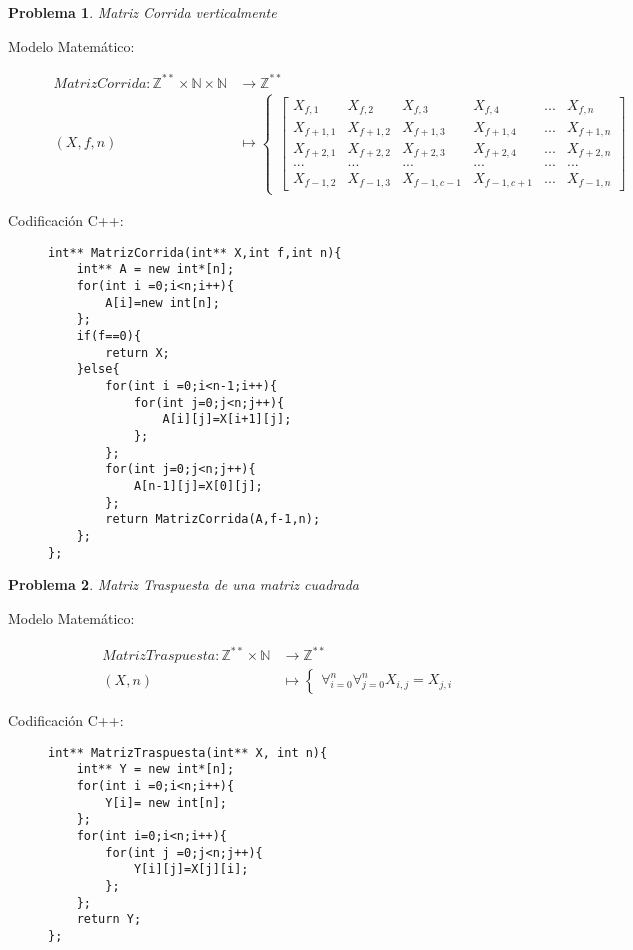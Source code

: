 \documentclass{article}
\theoremstyle{plain}
\theoremstyle{definition}
\newtheorem{problem}{Problema}
\begin{document}
\begin{problem} \emph{Matriz Corrida verticalmente }\\
\begin{description}
\item[Modelo Matemático:]
\begin{align*}
MatrizCorrida: \mathbb{Z}^{**}\times\mathbb{N}\times\mathbb{N} &\to \mathbb{Z}^{**}\\
(X,f,n) &\mapsto
\begin{cases}
\begin{bmatrix}
X_{f,1} & X_{f,2} & X_{f,3} & X_{f,4} & ...& X_{f,n} \\
X_{f+1,1} & X_{f+1,2} & X_{f+1,3} & X_{f+1,4} & ...& X_{f+1,n} \\
X_{f+2,1} & X_{f+2,2} & X_{f+2,3} & X_{f+2,4} & ...& X_{f+2,n} \\
... & ... & ... & ...& ... & ...\\
X_{f-1,2} & X_{f-1,3} & X_{f-1,c-1} & X_{f-1,c+1} & ... & X_{f-1,n} 
\end{bmatrix}
\end{cases}
\end{align*}
%
\item[Codificación \textsf{C++}:]\hfill
%
\begin{verbatim}
int** MatrizCorrida(int** X,int f,int n){
    int** A = new int*[n];
    for(int i =0;i<n;i++){
        A[i]=new int[n];
    };
    if(f==0){
        return X;
    }else{
        for(int i =0;i<n-1;i++){
            for(int j=0;j<n;j++){
                A[i][j]=X[i+1][j];
            };
        };
        for(int j=0;j<n;j++){
            A[n-1][j]=X[0][j];
        };
        return MatrizCorrida(A,f-1,n);
    };
};
\end{verbatim}
\end{description}
\end{problem}

\begin{problem} \emph{Matriz Traspuesta de una matriz cuadrada }\\
\begin{description}
\item[Modelo Matemático:]
\begin{align*}
MatrizTraspuesta: \mathbb{Z}^{**}\times\mathbb{N} &\to \mathbb{Z}^{**}\\
(X,n) &\mapsto
\begin{cases}
\forall_{i=0}^{n} \forall_{j=0}^{n} X_{i,j}= X_{j,i}
\end{cases}
\end{align*}
%
\item[Codificación \textsf{C++}:]\hfill
%
\begin{verbatim}
int** MatrizTraspuesta(int** X, int n){
    int** Y = new int*[n];
    for(int i =0;i<n;i++){
        Y[i]= new int[n];
    };
    for(int i=0;i<n;i++){
        for(int j =0;j<n;j++){
            Y[i][j]=X[j][i];
        };
    };
    return Y;
};

\end{verbatim}
\end{description}
\end{problem}
\end{document}
